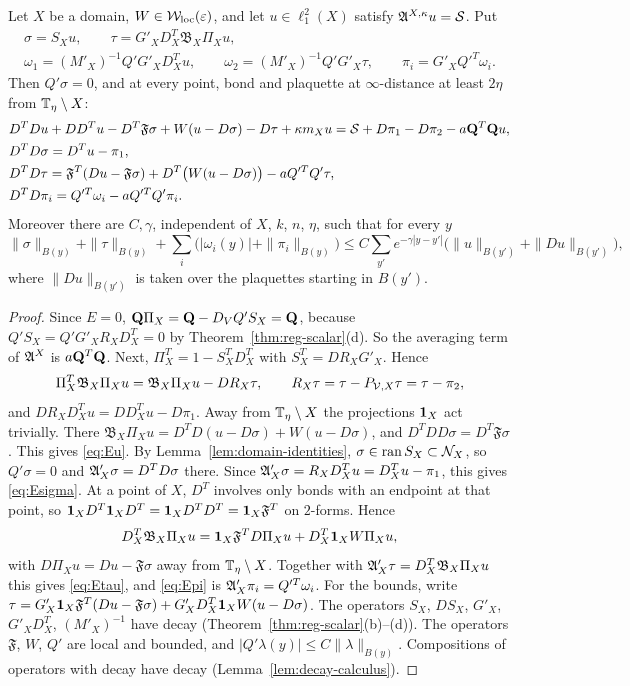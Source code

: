\begin{lemma}\label{lem:local-system}
Let $X$ be a domain, $W\in\mathcal W_{\rm loc}(\varepsilon)$, and let $u\in\ell^2_1(X)$ satisfy $\mathfrak A^{X,\kappa}u=\mathcal S$. Put
\[
\begin{gathered}
\sigma=S_Xu,\qquad\tau=G'_XD^T_X\mathfrak B_X\Pi_Xu,\\
\omega_1=(M'_X)^{-1}Q'G'_XD^T_Xu,\qquad\omega_2=(M'_X)^{-1}Q'G'_X\tau,\qquad\pi_i=G'_XQ'^T\omega_i .
\end{gathered}
\]
Then $Q'\sigma=0$, and at every point, bond and plaquette at $\infty$-distance at least $2\eta$ from $\mathbb T_\eta\setminus X$:
\begin{align}
&D^TDu+DD^Tu-D^T\mathfrak F\sigma+W(u-D\sigma)-D\tau+\kappa m_Xu=\mathcal S+D\pi_1-D\pi_2-a\mathbf Q^T\mathbf Q u,\label{eq:Eu}\\
&D^TD\sigma=D^Tu-\pi_1,\label{eq:Esigma}\\
&D^TD\tau=\mathfrak F^T(Du-\mathfrak F\sigma)+D^T\big(W(u-D\sigma)\big)-aQ'^TQ'\tau,\label{eq:Etau}\\
&D^TD\pi_i=Q'^T\omega_i-aQ'^TQ'\pi_i .\label{eq:Epi}
\end{align}
Moreover there are $C,\gamma$, independent of $X$, $k$, $n$, $\eta$, such that for every $y$
\[
\|\sigma\|_{B(y)}+\|\tau\|_{B(y)}+\sum_i\big(|\omega_i(y)|+\|\pi_i\|_{B(y)}\big)\le C\sum_{y'}e^{-\gamma|y-y'|}\big(\|u\|_{B(y')}+\|Du\|_{B(y')}\big),
\]
where $\|Du\|_{B(y')}$ is taken over the plaquettes starting in $B(y')$.
\end{lemma}

\begin{proof}
Since $E=0$, $\mathbf Q\Pi_X=\mathbf Q-D_VQ'S_X=\mathbf Q$, because $Q'S_X=Q'G'_XR_XD^T_X=0$ by Theorem~\ref{thm:reg-scalar}(d). So the averaging term of $\mathfrak A^X$ is $a\mathbf Q^T\mathbf Q$. Next, $\Pi_X^T=1-S_X^TD^T_X$ with $S_X^T=DR_XG'_X$. Hence
\[
\Pi_X^T\mathfrak B_X\Pi_Xu=\mathfrak B_X\Pi_Xu-DR_X\tau,\qquad R_X\tau=\tau-P_{\mathcal V,X}\tau=\tau-\pi_2 ,
\]
and $DR_XD^T_Xu=DD^T_Xu-D\pi_1$. Away from $\mathbb T_\eta\setminus X$ the projections $\mathbf 1_X$ act trivially. There $\mathfrak B_X\Pi_Xu=D^TD(u-D\sigma)+W(u-D\sigma)$, and $D^TDD\sigma=D^T\mathfrak F\sigma$. This gives \eqref{eq:Eu}. By Lemma~\ref{lem:domain-identities}, $\sigma\in\operatorname{ran} S_X\subset\mathcal N_X$, so $Q'\sigma=0$ and $\mathfrak A'_X\sigma=D^TD\sigma$ there. Since $\mathfrak A'_X\sigma=R_XD^T_Xu=D^T_Xu-\pi_1$, this gives \eqref{eq:Esigma}. At a point of $X$, $D^T$ involves only bonds with an endpoint at that point, so $\mathbf 1_XD^T\mathbf 1_XD^T=\mathbf 1_XD^TD^T=\mathbf 1_X\mathfrak F^T$ on $2$-forms. Hence
\[
D^T_X\mathfrak B_X\Pi_Xu=\mathbf 1_X\mathfrak F^TD\Pi_Xu+D^T_X\mathbf 1_XW\Pi_Xu ,
\]
with $D\Pi_Xu=Du-\mathfrak F\sigma$ away from $\mathbb T_\eta\setminus X$. Together with $\mathfrak A'_X\tau=D^T_X\mathfrak B_X\Pi_Xu$ this gives \eqref{eq:Etau}, and \eqref{eq:Epi} is $\mathfrak A'_X\pi_i=Q'^T\omega_i$. For the bounds, write $\tau=G'_X\mathbf 1_X\mathfrak F^T(Du-\mathfrak F\sigma)+G'_XD^T_X\mathbf 1_XW(u-D\sigma)$. The operators $S_X$, $DS_X$, $G'_X$, $G'_XD^T_X$, $(M'_X)^{-1}$ have decay (Theorem~\ref{thm:reg-scalar}(b)--(d)). The operators $\mathfrak F$, $W$, $Q'$ are local and bounded, and $|Q'\lambda(y)|\le C\|\lambda\|_{B(y)}$. Compositions of operators with decay have decay (Lemma~\ref{lem:decay-calculus}).
\end{proof}

